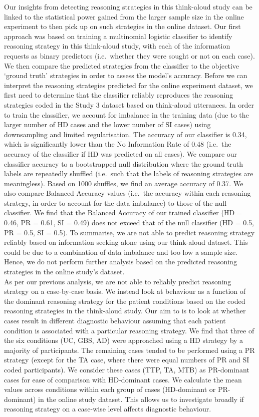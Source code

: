 \documentclass[a4paper, nobind]{templates/ociamthesis}
\begin{document}
Our insights from detecting reasoning strategies in this think-aloud study can be linked to the statistical power gained from the larger sample size in the online experiment to then pick up on such strategies in the online dataset. Our first approach was based on training a multinomial logistic classifier to identify reasoning strategy in this think-aloud study, with each of the information requests as binary predictors (i.e.~whether they were sought or not on each case). We then compare the predicted strategies from the classifier to the objective `ground truth' strategies in order to assess the model's accuracy. Before we can interpret the reasoning strategies predicted for the online experiment dataset, we first need to determine that the classifier reliably reproduces the reasoning strategies coded in the Study 3 dataset based on think-aloud utterances. In order to train the classifier, we account for imbalance in the training data (due to the larger number of HD cases and the lower number of SI cases) using downsampling and limited regularisation. The accuracy of our classifier is 0.34, which is significantly lower than the No Information Rate of 0.48 (i.e.~the accuracy of the classifier if HD was predicted on all cases). We compare our classifier accuracy to a bootstrapped null distribution where the ground truth labels are repeatedly shuffled (i.e.~such that the labels of reasoning strategies are meaningless). Based on 1000 shuffles, we find an average accuracy of 0.37. We also compare Balanced Accuracy values (i.e.~the accuracy within each reasoning strategy, in order to account for the data imbalance) to those of the null classifier. We find that the Balanced Accuracy of our trained classifier (HD = 0.46, PR = 0.61, SI = 0.49) does not exceed that of the null classifier (HD = 0.5, PR = 0.5, SI = 0.5). To summarise, we are not able to predict reasoning strategy reliably based on information seeking alone using our think-aloud dataset. This could be due to a combination of data imbalance and too low a sample size. Hence, we do not perform further analysis based on the predicted reasoning strategies in the online study's dataset.\\

As per our previous analysis, we are not able to reliably predict reasoning strategy on a case-by-case basis. We instead look at behaviour as a function of the dominant reasoning strategy for the patient conditions based on the coded reasoning strategies in the think-aloud study. Our aim to is to look at whether cases result in different diagnostic behaviour assuming that each patient condition is associated with a particular reasoning strategy. We find that three of the six conditions (UC, GBS, AD) were approached using a HD strategy by a majority of participants. The remaining cases tended to be performed using a PR strategy (except for the TA case, where there were equal numbers of PR and SI coded participants). We consider these cases (TTP, TA, MTB) as PR-dominant cases for ease of comparison with HD-dominant cases. We calculate the mean values across conditions within each group of cases (HD-dominant or PR-dominant) in the online study dataset. This allows us to investigate broadly if reasoning strategy on a case-wise level affects diagnostic behaviour.
\end{document}
